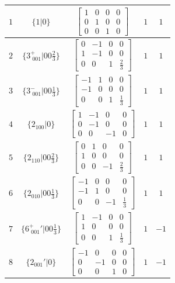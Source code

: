 \documentclass[fleqn,8pt]{jsarticle}
\begin{document}
\begin{longtable}{ccccc}
$ 1 $ & $ \{1|0\} $ & $ \begin{bmatrix} 1 & 0 & 0 & 0 \\ 0 & 1 & 0 & 0 \\ 0 & 0 & 1 & 0 \end{bmatrix} $ & $ 1 $ & $ 1 $ \\ \hline
$ 2 $ & $ \{3^{+}_{\,\,001}|0 0 \frac{2}{3}\} $ & $ \begin{bmatrix} 0 & -1 & 0 & 0 \\ 1 & -1 & 0 & 0 \\ 0 & 0 & 1 & \frac{2}{3} \end{bmatrix} $ & $ 1 $ & $ 1 $ \\ \hline
$ 3 $ & $ \{3^{-}_{\,\,001}|0 0 \frac{1}{3}\} $ & $ \begin{bmatrix} -1 & 1 & 0 & 0 \\ -1 & 0 & 0 & 0 \\ 0 & 0 & 1 & \frac{1}{3} \end{bmatrix} $ & $ 1 $ & $ 1 $ \\ \hline
$ 4 $ & $ \{2{}_{100}|0\} $ & $ \begin{bmatrix} 1 & -1 & 0 & 0 \\ 0 & -1 & 0 & 0 \\ 0 & 0 & -1 & 0 \end{bmatrix} $ & $ 1 $ & $ 1 $ \\ \hline
$ 5 $ & $ \{2{}_{110}|0 0 \frac{2}{3}\} $ & $ \begin{bmatrix} 0 & 1 & 0 & 0 \\ 1 & 0 & 0 & 0 \\ 0 & 0 & -1 & \frac{2}{3} \end{bmatrix} $ & $ 1 $ & $ 1 $ \\ \hline
$ 6 $ & $ \{2{}_{010}|0 0 \frac{1}{3}\} $ & $ \begin{bmatrix} -1 & 0 & 0 & 0 \\ -1 & 1 & 0 & 0 \\ 0 & 0 & -1 & \frac{1}{3} \end{bmatrix} $ & $ 1 $ & $ 1 $ \\ \hline
$ 7 $ & $ \{6^{+}_{\,\,001}{}'|0 0 \frac{1}{3}\} $ & $ \begin{bmatrix} 1 & -1 & 0 & 0 \\ 1 & 0 & 0 & 0 \\ 0 & 0 & 1 & \frac{1}{3} \end{bmatrix} $ & $ 1 $ & $ -1 $ \\ \hline
$ 8 $ & $ \{2{}_{001}{}'|0\} $ & $ \begin{bmatrix} -1 & 0 & 0 & 0 \\ 0 & -1 & 0 & 0 \\ 0 & 0 & 1 & 0 \end{bmatrix} $ & $ 1 $ & $ -1 $ \\ \hline

\end{longtable}
\end{document}
